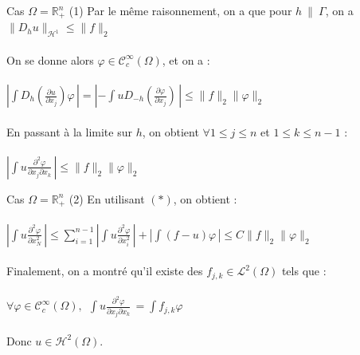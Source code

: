 \documentclass[10pt]{beamer}
\begin{document}
\begin{frame}{Cas $\Omega=\mathbb{R}^n_+$ (1)}
Par le même raisonnement, on a que pour $h \ \| \ \Gamma$, on a $\|D_hu\|_{\mathcal{H}^1} \leq \|f\|_2  $ \\~\\
On se donne alors $\varphi \in \mathcal{C}^\infty_c(\Omega)$, et on a : \\~\\

$\displaystyle \left | \int D_h (\frac{\partial u}{\partial x_j} )\varphi \, \right | =  \left |-\int uD_{-h} (\frac{\partial \varphi}{\partial x_j})\, \right | \leq \|f\|_2 \|\varphi\|_2 $ \\~\\

En passant à la limite sur $h$, on obtient $\forall 1\leq j \leq n$ et $1 \leq k \leq n-1$ : \\~\\

$\left |\displaystyle \int u \frac{\partial^2 \varphi}{\partial x_j \partial x_k} \, \right | \leq \|f\|_2 \|\varphi\|_2 $
\end{frame}


\begin{frame}{Cas $\Omega=\mathbb{R}^n_+$ (2)}
En utilisant $(*)$, on obtient : \\~\\

$\left |\displaystyle \int u \frac{\partial^2 \varphi}{\partial x_N^2} \, \right | \leq \displaystyle \sum_{i=1}^{n-1} \left |\displaystyle \int u \frac{\partial^2 \varphi}{\partial x_i^2} \, \right | + \left |\displaystyle \int (f-u) \varphi \, \right | \leq C \|f\|_2 \|\varphi\|_2$ \\~\\

Finalement, on a montré qu'il existe des $f_{j,k} \in \mathcal{L}^2(\Omega)$ tels que : \\~\\

$\forall \varphi  \in \mathcal{C}^\infty_c(\Omega), \ \ \displaystyle \int u \frac{\partial^2 \varphi}{\partial x_j  \partial x_k} \, = \displaystyle \int f_{j,k} \varphi \,$ \\~\\

Donc $u\in \mathcal{H}^2(\Omega)$.
\end{frame}
\end{document}
